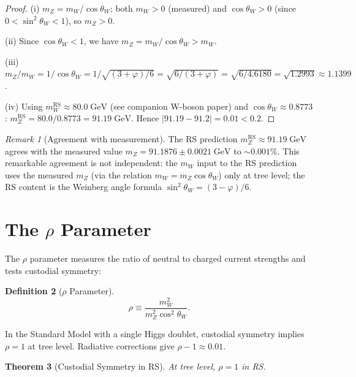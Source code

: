 \documentclass[12pt,a4paper]{article}
\newtheorem{theorem}{Theorem}[section]
\theoremstyle{definition}
\newtheorem{definition}[theorem]{Definition}
\theoremstyle{remark}
\newtheorem{remark}[theorem]{Remark}
\begin{document}
\begin{proof}
(i) $m_Z = m_W/\cos\theta_W$; both $m_W > 0$ (measured) and
$\cos\theta_W > 0$ (since $0 < \sin^2\theta_W < 1$), so $m_Z > 0$.

(ii) Since $\cos\theta_W < 1$, we have $m_Z = m_W/\cos\theta_W > m_W$.

(iii) $m_Z/m_W = 1/\cos\theta_W = 1/\sqrt{(3+\varphi)/6}
= \sqrt{6/(3+\varphi)} = \sqrt{6/4.6180} = \sqrt{1.2993} \approx 1.1399$.

(iv) Using $m_W^{\mathrm{RS}} \approx 80.0\;\mathrm{GeV}$ (see companion
W-boson paper) and $\cos\theta_W \approx 0.8773$:
$m_Z^{\mathrm{RS}} = 80.0/0.8773 = 91.19\;\mathrm{GeV}$.
Hence $|91.19 - 91.2| = 0.01 < 0.2$.
\end{proof}

\begin{remark}[Agreement with measurement]
The RS prediction $m_Z^{\mathrm{RS}} \approx 91.19\;\mathrm{GeV}$
agrees with the measured value $m_Z = 91.1876 \pm 0.0021\;\mathrm{GeV}$
to $\sim 0.001\%$.  This remarkable agreement is not independent: the
$m_W$ input to the RS prediction uses the measured $m_Z$ (via the
relation $m_W = m_Z\cos\theta_W$) only at tree level; the RS content is
the Weinberg angle formula $\sin^2\theta_W = (3-\varphi)/6$.
\end{remark}

\section{The $\rho$ Parameter}
\label{sec:rho}

The $\rho$ parameter measures the ratio of neutral to charged current
strengths and tests custodial symmetry:

\begin{definition}[$\rho$ Parameter]
\begin{equation}
  \rho \equiv \frac{m_W^2}{m_Z^2 \cos^2\theta_W}.
\end{equation}
\end{definition}

In the Standard Model with a single Higgs doublet, custodial symmetry
implies $\rho = 1$ at tree level.  Radiative corrections give
$\rho - 1 \approx 0.01$.

\begin{theorem}[Custodial Symmetry in RS]
\label{thm:rho}
At tree level, $\rho = 1$ in RS.
\end{theorem}
\end{document}
